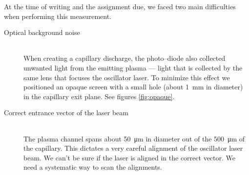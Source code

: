 \documentclass[../main.tex]{subfiles}
\begin{document}
At the time of writing and the assignment due, we faced two main difficulties when performing this measurement.
\begin{description}
  \item[\textnormal{Optical background noise}] \hfill \\ When creating a capillary discharge, the photo--diode also collected unwanted light from the emitting plasma --- light that is collected by the same lens that focuses the oscillator laser. To minimize this effect we positioned an opaque screen with a small hole (about \SI{1}{\mm} in diameter) in the capillary exit plane. See figures \ref{fig:opaque}.
  \item[\textnormal{Correct entrance vector of the laser beam}] \hfill \\ The plasma channel spans about \SI{50}{\um} in diameter out of the \SI{500}{\um} of the capillary. This dictates a very careful alignment of the oscillator laser beam. We can't be sure if the laser is aligned in the correct vector. We need a systematic way to scan the alignments.
\end{description}
\end{document}
